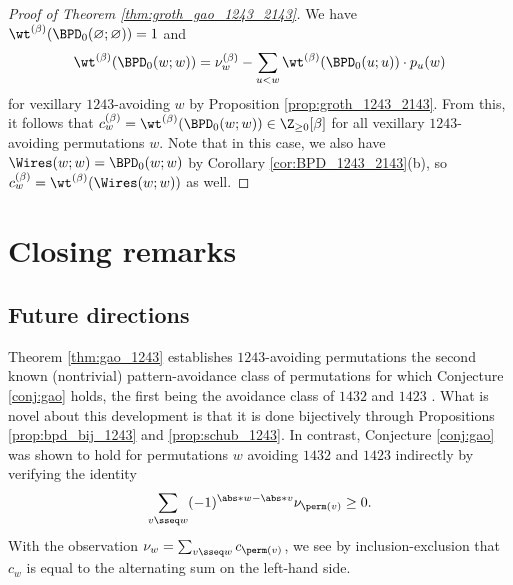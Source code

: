 \begin{proof}[Proof of Theorem \ref{thm:groth_gao_1243_2143}]
We have $\wt^{(\beta)}(\BPD_0(\varnothing;\varnothing)) = 1$ and \[
    \wt^{(\beta)}(\BPD_0(w;w))
    = \nu^{(\beta)}_w - \sum_{u< w} \wt^{(\beta)}(\BPD_0(u;u))\cdot p_u(w)
\] for vexillary $1243$-avoiding $w$ by Proposition \ref{prop:groth_1243_2143}.
From this, it follows that $c^{(\beta)}_w = \wt^{(\beta)}(\BPD_0(w;w)) \in \Z_{\geq0}[\beta]$ for all vexillary $1243$-avoiding permutations $w$.
Note that in this case, we also have $\Wires(w;w) = \BPD_0(w;w)$ by Corollary \ref{cor:BPD_1243_2143}(b), so $c^{(\beta)}_w = \wt^{(\beta)}(\Wires(w;w))$ as well.
\end{proof}





\section{Closing remarks}

\subsection{Future directions}

Theorem \ref{thm:gao_1243} establishes $1243$-avoiding permutations the second known (nontrivial) pattern-avoidance class of permutations for which Conjecture \ref{conj:gao} holds, the first being the avoidance class of $1432$ and $1423$ \cite{MT22}.
What is novel about this development is that it is done bijectively through Propositions \ref{prop:bpd_bij_1243} and \ref{prop:schub_1243}.
In contrast, Conjecture \ref{conj:gao} was shown to hold for permutations $w$ avoiding $1432$ and $1423$ \cite{MT22} indirectly by verifying the identity \[
    \sum_{v\sseq w} (-1)^{\abs*{w}-\abs*{v}}\nu_{\perm(v)} \geq 0.
\]
With the observation $\nu_w = \sum_{v\sseq w} c_{\perm(v)}$, we see by inclusion-exclusion that $c_w$ is equal to the alternating sum on the left-hand side.

